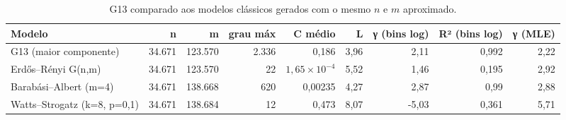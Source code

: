 \begin{table}[t]
\centering
\small
\caption{G13 comparado aos modelos clássicos gerados com o mesmo $n$ e $m$ aproximado.}
\label{tab:modelos}
\begin{adjustbox}{max width=\linewidth}
\begin{tabular}{lrrrrrrrr}
\toprule
Modelo & n & m & grau máx & C médio & L & γ (bins log) & R² (bins log) & γ (MLE) \\
\midrule
G13 (maior componente) & 34.671 & 123.570 & 2.336 & 0,186 & 3,96 & 2,11 & 0,992 & 2,22 \\
Erdős–Rényi G(n,m) & 34.671 & 123.570 & 22 & $1,65 \times 10^{-4}$ & 5,52 & 1,46 & 0,195 & 2,92 \\
Barabási–Albert (m=4) & 34.671 & 138.668 & 620 & 0,00235 & 4,27 & 2,87 & 0,99 & 2,88 \\
Watts–Strogatz (k=8, p=0,1) & 34.671 & 138.684 & 12 & 0,473 & 8,07 & -5,03 & 0,361 & 5,71 \\
\bottomrule
\end{tabular}
\end{adjustbox}
\end{table}

